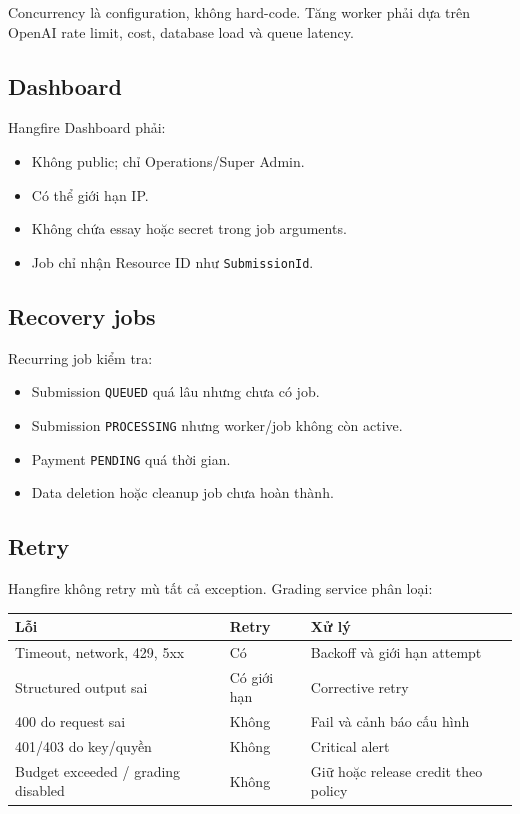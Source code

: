 \documentclass[11pt,a4paper]{article}
\newcommand{\code}[1]{\texttt{#1}}
\begin{document}
Concurrency là configuration, không hard-code. Tăng worker phải dựa trên OpenAI rate limit, cost, database load và queue latency.

\subsection{Dashboard}

Hangfire Dashboard phải:

\begin{itemize}
  \item Không public; chỉ Operations/Super Admin.
  \item Có thể giới hạn IP.
  \item Không chứa essay hoặc secret trong job arguments.
  \item Job chỉ nhận Resource ID như \code{SubmissionId}.
\end{itemize}

\subsection{Recovery jobs}

Recurring job kiểm tra:

\begin{itemize}
  \item Submission \code{QUEUED} quá lâu nhưng chưa có job.
  \item Submission \code{PROCESSING} nhưng worker/job không còn active.
  \item Payment \code{PENDING} quá thời gian.
  \item Data deletion hoặc cleanup job chưa hoàn thành.
\end{itemize}

\subsection{Retry}

Hangfire không retry mù tất cả exception. Grading service phân loại:

\begin{longtable}{L{0.42\textwidth}L{0.22\textwidth}L{0.26\textwidth}}
\toprule
\textbf{Lỗi} & \textbf{Retry} & \textbf{Xử lý} \\
\midrule
Timeout, network, 429, 5xx & Có & Backoff và giới hạn attempt \\
Structured output sai & Có giới hạn & Corrective retry \\
400 do request sai & Không & Fail và cảnh báo cấu hình \\
401/403 do key/quyền & Không & Critical alert \\
Budget exceeded / grading disabled & Không & Giữ hoặc release credit theo policy \\
\bottomrule
\end{longtable}
\end{document}
